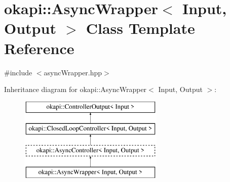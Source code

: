 \hypertarget{classokapi_1_1AsyncWrapper}{}\section{okapi\+::Async\+Wrapper$<$ Input, Output $>$ Class Template Reference}
\label{classokapi_1_1AsyncWrapper}


{\ttfamily \#include $<$async\+Wrapper.\+hpp$>$}

Inheritance diagram for okapi\+::Async\+Wrapper$<$ Input, Output $>$\+:\begin{figure}[H]
\begin{center}
\leavevmode
\includegraphics[height=4.000000cm]{classokapi_1_1AsyncWrapper}
\end{center}
\end{figure}
